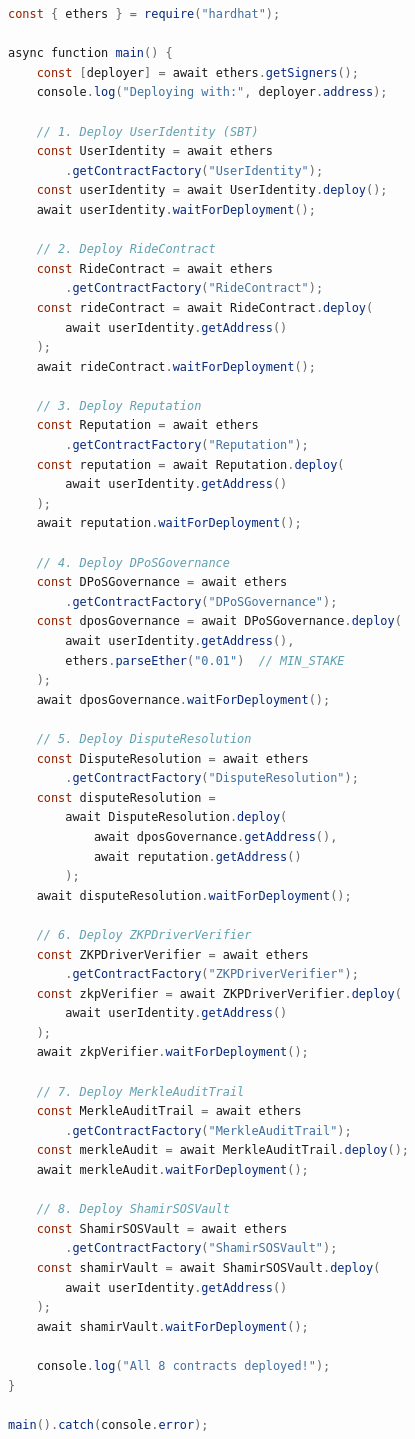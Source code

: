 \documentclass[12pt]{report}
\theoremstyle{plain}
\theoremstyle{definition}
\theoremstyle{remark}
\begin{document}
\begin{lstlisting}[language=Java, caption=deploy.js]
const { ethers } = require("hardhat");

async function main() {
    const [deployer] = await ethers.getSigners();
    console.log("Deploying with:", deployer.address);
    
    // 1. Deploy UserIdentity (SBT)
    const UserIdentity = await ethers
        .getContractFactory("UserIdentity");
    const userIdentity = await UserIdentity.deploy();
    await userIdentity.waitForDeployment();
    
    // 2. Deploy RideContract
    const RideContract = await ethers
        .getContractFactory("RideContract");
    const rideContract = await RideContract.deploy(
        await userIdentity.getAddress()
    );
    await rideContract.waitForDeployment();
    
    // 3. Deploy Reputation
    const Reputation = await ethers
        .getContractFactory("Reputation");
    const reputation = await Reputation.deploy(
        await userIdentity.getAddress()
    );
    await reputation.waitForDeployment();
    
    // 4. Deploy DPoSGovernance
    const DPoSGovernance = await ethers
        .getContractFactory("DPoSGovernance");
    const dposGovernance = await DPoSGovernance.deploy(
        await userIdentity.getAddress(),
        ethers.parseEther("0.01")  // MIN_STAKE
    );
    await dposGovernance.waitForDeployment();
    
    // 5. Deploy DisputeResolution
    const DisputeResolution = await ethers
        .getContractFactory("DisputeResolution");
    const disputeResolution = 
        await DisputeResolution.deploy(
            await dposGovernance.getAddress(),
            await reputation.getAddress()
        );
    await disputeResolution.waitForDeployment();
    
    // 6. Deploy ZKPDriverVerifier
    const ZKPDriverVerifier = await ethers
        .getContractFactory("ZKPDriverVerifier");
    const zkpVerifier = await ZKPDriverVerifier.deploy(
        await userIdentity.getAddress()
    );
    await zkpVerifier.waitForDeployment();
    
    // 7. Deploy MerkleAuditTrail
    const MerkleAuditTrail = await ethers
        .getContractFactory("MerkleAuditTrail");
    const merkleAudit = await MerkleAuditTrail.deploy();
    await merkleAudit.waitForDeployment();
    
    // 8. Deploy ShamirSOSVault
    const ShamirSOSVault = await ethers
        .getContractFactory("ShamirSOSVault");
    const shamirVault = await ShamirSOSVault.deploy(
        await userIdentity.getAddress()
    );
    await shamirVault.waitForDeployment();
    
    console.log("All 8 contracts deployed!");
}

main().catch(console.error);
\end{lstlisting}
\end{document}
